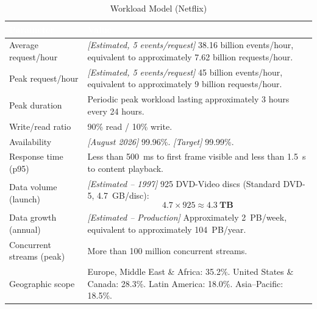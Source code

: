 \documentclass{article}
\begin{document}
\begin{table}[H]
\centering
\small
\renewcommand{\arraystretch}{1.35}

\caption{Workload Model (Netflix)}
\label{tab:workload_model}

\begin{tabularx}{\textwidth}{|p{4.0cm}|X|}
\hline

\rowcolor[HTML]{1F2937}
\textcolor{white}{\textbf{Parameter}} &
\textcolor{white}{\textbf{Value}} \\

\hline

Average request/hour
&
\textit{[Estimated, 5 events/request]}
38.16 billion events/hour,
equivalent to approximately
7.62 billion requests/hour.
\cite{clickhouse2025}
\\
\hline

Peak request/hour
&
\textit{[Estimated, 5 events/request]}
45 billion events/hour,
equivalent to approximately
9 billion requests/hour.
\cite{clickhouse2025}
\\
\hline

Peak duration
&
Periodic peak workload lasting approximately
3 hours every 24 hours.
\cite{netflixspikes2024}
\\
\hline

Write/read ratio
&
90\% read / 10\% write.
\cite{netflixviewingdata}
\\
\hline

Availability
&
\textit{[August 2026]} 99.96\%.
\newline
\textit{[Target]} 99.99\%.
\cite{pingdom2026,concurrentstreams}
\\
\hline

Response time (p95)
&
Less than 500~ms to first frame visible and
less than 1.5~s to content playback.
\cite{oschina2026,concurrentstreams}
\\
\hline

Data volume (launch)
&
\textit{[Estimated -- 1997]}
925 DVD-Video discs (Standard DVD-5, 4.7~GB/disc):
\[
4.7 \times 925 \approx \mathbf{4.3~TB}
\]
\cite{netflixhistory}
\\
\hline

Data growth (annual)
&
\textit{[Estimated -- Production]}
Approximately 2~PB/week,
equivalent to approximately 104~PB/year.
\cite{netflixdatadeluge}
\\
\hline

Concurrent streams (peak)
&
More than 100 million concurrent streams.
\cite{concurrentstreams}
\\
\hline

Geographic scope
&
Europe, Middle East \& Africa: 35.2\%.
\newline
United States \& Canada: 28.3\%.
\newline
Latin America: 18.0\%.
\newline
Asia--Pacific: 18.5\%.
\cite{businessofapps2026}
\\
\hline

\end{tabularx}

\end{table}
\end{document}
